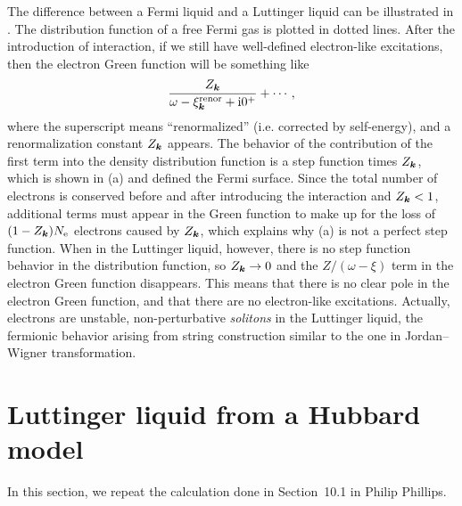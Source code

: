 \documentclass[hyperref, a4paper]{article}
\newcommand*{\ii}{\mathrm{i}}
\begin{document}
The difference between a Fermi liquid and a Luttinger liquid can be illustrated in .
The distribution function of a free Fermi gas is plotted in dotted lines. After the introduction of interaction,
if we still have well-defined electron-like excitations, then the electron Green function will be something like 
\[
    \frac{Z_{\vb*{k}}}{\omega - \xi_{\vb*{k}}^\text{renor} + \ii 0^+} + \cdots,
\]
where the superscript means ``renormalized'' (i.e. corrected by self-energy), and a renormalization constant 
$Z_{\vb*{k}}$ appears. The behavior of the contribution of the first term into the density distribution function 
is a step function times $Z_{\vb*{k}}$, which is shown in (a) and defined the Fermi surface. Since the total 
number of electrons is conserved before and after introducing the interaction and $Z_{\vb*{k}} < 1$, 
additional terms must appear in the Green function to make up for the loss of $(1 - Z_{\vb*{k}}) N_\text{e}$
electrons caused by $Z_{\vb*{k}}$, which explains why (a) is not a perfect 
step function. When in the Luttinger liquid, however, there is no step function behavior in the distribution
function, so $Z_{\vb*{k}} \to 0$ and the $Z/(\omega - \xi)$ term in the electron Green function disappears.
This means that there is no clear pole in the electron Green function, and that there are no electron-like excitations. Actually, electrons are unstable, non-perturbative \emph{solitons} in the Luttinger liquid, 
the fermionic behavior arising from string construction similar to the one in Jordan–Wigner transformation.

\section{Luttinger liquid from a Hubbard model}

In this section, we repeat the calculation done in Section~10.1 in Philip Phillips. 
\end{document}

